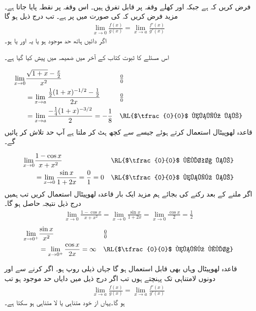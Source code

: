 \\
فرض کریں کہ  ہے جبکہ    اور  کھلے وقفہ   پر قابل تفرق ہیں۔ اس وقفہ پر نقطہ  پایا جاتا ہے۔مزید فرض کریں کہ  کی صورت میں  پر  ہے۔ تب درج ذیل ہو گا
\begin{align}
\lim_{x\to 0}\frac{f(x)}{g(x)}=\lim_{x\to a}\frac{f'(x)}{g'(x)}
\end{align}
اگر دائیں ہاتھ حد موجود ہو یا یہ  اور یا  ہو۔

اس مسئلے کا ثبوت کتاب کے آخر میں ضمیمہ میں پیش کیا گیا ہے۔ 

\begin{align*}
\lim_{x\to 0}&\frac{\sqrt{1+x}-\tfrac{x}{2}}{x^2}&&\tfrac{0}{0}\\
&=\lim_{x\to a}\frac{\tfrac{1}{2}(1+x)^{-1/2}-\tfrac{1}{2}}{2x}&&\tfrac{0}{0}\\
&=\lim_{x\to a}\frac{-\tfrac{1}{4}(1+x)^{-3/2}}{2}=-\frac{1}{8}&&\text{\RL{$\tfrac{0}{0}$ نہیں ہے}}
\end{align*}
قاعدہ لھوپیٹال استعمال کرتے ہوئے جیسے   سے کچھ ہٹ کر ملتا ہے آپ حد تلاش کر پائیں گے۔

\begin{align*}
\lim_{x\to 0}&\frac{1-\cos x}{x+x^2}&&\text{\RL{$\tfrac{0}{0}$ ملتا ہے}}\\
&=\lim_{x\to 0}\frac{\sin x}{1+2x}=\frac{0}{1}=0&&\text{\RL{$\tfrac{0}{0}$ نہیں ہے}}
\end{align*}
اگر  ملنے کے بعد رکنے کی بجائے ہم مزید ایک بار قاعدہ لھوپیٹال استعمال کریں تب ہمیں درج ذیل  نتیجہ حاصل ہو گا۔
\begin{align*}
\lim_{x\to0}\frac{1-\cos x}{x+x^2}=\lim_{x\to 0}\frac{\sin x}{1+2x}=\lim_{x\to 0}\frac{\cos x}{2}=\frac{1}{2}
\end{align*} 
\begin{align*}
\lim_{x\to 0^+}&\frac{\sin x}{x^2}&&\tfrac{0}{0}\\
&=\lim_{x\to 0^+}\frac{\cos x}{2x}=\infty&&\text{\RL{$\tfrac{0}{0}$ نہیں ملا}}
\end{align*}

قاعدہ لھوپیٹال وہاں بھی قابل استعمال ہو گا جہاں ذیلی روپ  ہو۔ اگر  کرنے سے  اور  دونوں لامتناہی تک پہنچتے ہوں تب اگر درج ذیل میں دایاں حد موجود ہو تب
\begin{align*}
\lim_{x\to a}\frac{f(x)}{g(x)}=\lim_{x\to a}\frac{f'(x)}{g'(x)}
\end{align*}
ہو گا۔یہاں  از خود متناہی یا لا متناہی ہو سکتا ہے۔

